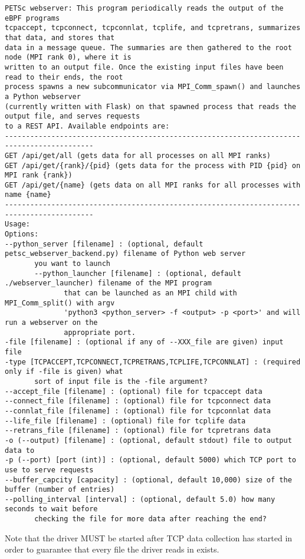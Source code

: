 \begin{Verbatim}[xleftmargin=-3cm]
PETSc webserver: This program periodically reads the output of the eBPF programs
tcpaccept, tcpconnect, tcpconnlat, tcplife, and tcpretrans, summarizes that data, and stores that
data in a message queue. The summaries are then gathered to the root node (MPI rank 0), where it is
written to an output file. Once the existing input files have been read to their ends, the root
process spawns a new subcommunicator via MPI_Comm_spawn() and launches a Python webserver
(currently written with Flask) on that spawned process that reads the output file, and serves requests
to a REST API. Available endpoints are:
-------------------------------------------------------------------------------------------
GET /api/get/all (gets data for all processes on all MPI ranks)
GET /api/get/{rank}/{pid} (gets data for the process with PID {pid} on MPI rank {rank})
GET /api/get/{name} (gets data on all MPI ranks for all processes with name {name}
-------------------------------------------------------------------------------------------
Usage:
Options:
--python_server [filename] : (optional, default petsc_webserver_backend.py) filename of Python web server
       you want to launch
       --python_launcher [filename] : (optional, default ./webserver_launcher) filename of the MPI program
              that can be launched as an MPI child with MPI_Comm_split() with argv
              'python3 <python_server> -f <output> -p <port>' and will run a webserver on the
              appropriate port.
-file [filename] : (optional if any of --XXX_file are given) input file
-type [TCPACCEPT,TCPCONNECT,TCPRETRANS,TCPLIFE,TCPCONNLAT] : (required only if -file is given) what
       sort of input file is the -file argument?
--accept_file [filename] : (optional) file for tcpaccept data
--connect_file [filename] : (optional) file for tcpconnect data
--connlat_file [filename] : (optional) file for tcpconnlat data
--life_file [filename] : (optional) file for tcplife data
--retrans_file [filename] : (optional) file for tcpretrans data
-o (--output) [filename] : (optional, default stdout) file to output data to
-p (--port) [port (int)] : (optional, default 5000) which TCP port to use to serve requests
--buffer_capcity [capacity] : (optional, default 10,000) size of the buffer (number of entries)
--polling_interval [interval] : (optional, default 5.0) how many seconds to wait before
       checking the file for more data after reaching the end?
\end{Verbatim}
Note that the driver MUST be started after TCP data collection has started in order to guarantee that every file the driver reads in exists.
